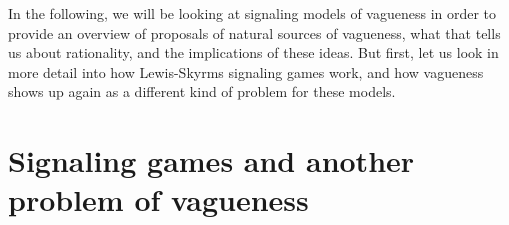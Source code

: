 \documentclass[a4paper]{article}
\begin{document}
In the following, we will be looking at signaling models of vagueness in order to provide an overview of proposals of natural sources of vagueness, what that tells us about rationality, and the implications of these ideas.
But first, let us look in more detail into how Lewis-Skyrms signaling games work, and how vagueness shows up again as a different kind of problem for these models.


\section{Signaling games and another problem of vagueness}
\label{sec:signaling-and-Lipman}
\end{document}
